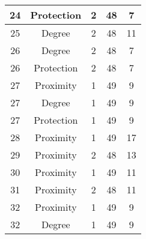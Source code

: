 \documentclass[results.tex]{subfiles}
\begin{document}
\begin{center}
\begin{tabular}{| c || c | c | c | c |}
            \hline
            24                      & Protection                   & 2                      & 48                      & 7                    \\
            \hline
            25                      & Degree                       & 2                      & 48                      & 11                   \\
            \hline
            26                      & Degree                       & 2                      & 48                      & 7                    \\
            \hline
            26                      & Protection                   & 2                      & 48                      & 7                    \\
            \hline
            27                      & Proximity                    & 1                      & 49                      & 9                    \\
            \hline
            27                      & Degree                       & 1                      & 49                      & 9                    \\
            \hline
            27                      & Protection                   & 1                      & 49                      & 9                    \\
            \hline
            28                      & Proximity                    & 1                      & 49                      & 17                   \\
            \hline
            29                      & Proximity                    & 2                      & 48                      & 13                   \\
            \hline
            30                      & Proximity                    & 1                      & 49                      & 11                   \\
            \hline
            31                      & Proximity                    & 2                      & 48                      & 11                   \\
            \hline
            32                      & Proximity                    & 1                      & 49                      & 9                    \\
            \hline
            32                      & Degree                       & 1                      & 49                      & 9                    \\

\end{tabular}
\end{center}
\end{document}
